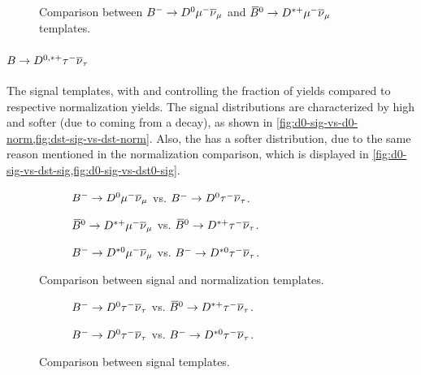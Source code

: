 \begin{figure}[htb]
    \caption{
        Comparison between ${{{B}^-}} \rightarrow {\ensuremath{{D}^0}}{\ensuremath{\mu^-}}{\ensuremath{{\overline{\nu}}_\mu}}$ and
        ${{\kern 0.18em\overline{\kern -0.18em B}}{}^0} \rightarrow {\ensuremath{{D}^{*+}}}{\ensuremath{\mu^-}}{\ensuremath{{\overline{\nu}}_\mu}}$ templates.
    }
    \label{fig:d0-norm-vs-dst-norm}
\end{figure}

\paragraph{$B \rightarrow D^{0,*+}{\tau^-}{{\overline{\nu}}_\tau}$}
The signal templates, with \RD and \RDstp controlling the fraction
of yields compared to respective normalization yields.
The signal distributions are characterized by high \mmSq and softer
\el (due to \muon coming from a \tauon decay),
as shown in \cref{fig:d0-sig-vs-d0-norm,fig:dst-sig-vs-dst-norm}.
Also, the \Dz\tauon has a softer \qSq distribution, due to the same reason
mentioned in the normalization comparison, which is displayed in
\cref{fig:d0-sig-vs-dst-sig,fig:d0-sig-vs-dst0-sig}.

\begin{figure}[htb]
    \begin{subfigure}{\textwidth}
        \caption{
            ${{{B}^-}} \rightarrow {\ensuremath{{D}^0}}{\ensuremath{\mu^-}}{\ensuremath{{\overline{\nu}}_\mu}}$ vs.
            ${{{B}^-}} \rightarrow {\ensuremath{{D}^0}}{\ensuremath{\tau^-}}{\ensuremath{{\overline{\nu}}_\tau}}$.
        }
        \label{fig:d0-sig-vs-d0-norm}
    \end{subfigure}

    \begin{subfigure}{\textwidth}
        \caption{
            ${{\kern 0.18em\overline{\kern -0.18em B}}{}^0} \rightarrow {\ensuremath{{D}^{*+}}}{\ensuremath{\mu^-}}{\ensuremath{{\overline{\nu}}_\mu}}$ vs.
            ${{\kern 0.18em\overline{\kern -0.18em B}}{}^0} \rightarrow {\ensuremath{{D}^{*+}}}{\ensuremath{\tau^-}}{\ensuremath{{\overline{\nu}}_\tau}}$.
        }
        \label{fig:dst-sig-vs-dst-norm}
    \end{subfigure}

    \begin{subfigure}{\textwidth}
        \caption{
            ${{{B}^-}} \rightarrow {\ensuremath{{D}^{*0}}}{\ensuremath{\mu^-}}{\ensuremath{{\overline{\nu}}_\mu}}$ vs.
            ${{{B}^-}} \rightarrow {\ensuremath{{D}^{*0}}}{\ensuremath{\tau^-}}{\ensuremath{{\overline{\nu}}_\tau}}$.
        }
        \label{fig:dst0-sig-vs-dst0-norm}
    \end{subfigure}
    \caption{Comparison between signal and normalization templates.}
\end{figure}

\begin{figure}[htb]
    \begin{subfigure}{\textwidth}
        \caption{
            ${{{B}^-}} \rightarrow {\ensuremath{{D}^0}}{\ensuremath{\tau^-}}{\ensuremath{{\overline{\nu}}_\tau}}$ vs.
            ${{\kern 0.18em\overline{\kern -0.18em B}}{}^0} \rightarrow {\ensuremath{{D}^{*+}}}{\ensuremath{\tau^-}}{\ensuremath{{\overline{\nu}}_\tau}}$.
        }
        \label{fig:d0-sig-vs-dst-sig}
    \end{subfigure}

    \begin{subfigure}{\textwidth}
        \caption{
            ${{{B}^-}} \rightarrow {\ensuremath{{D}^0}}{\ensuremath{\tau^-}}{\ensuremath{{\overline{\nu}}_\tau}}$ vs.
            ${{{B}^-}} \rightarrow {\ensuremath{{D}^{*0}}}{\ensuremath{\tau^-}}{\ensuremath{{\overline{\nu}}_\tau}}$.
        }
        \label{fig:d0-sig-vs-dst0-sig}
    \end{subfigure}

    \caption{Comparison between signal templates.}
\end{figure}

